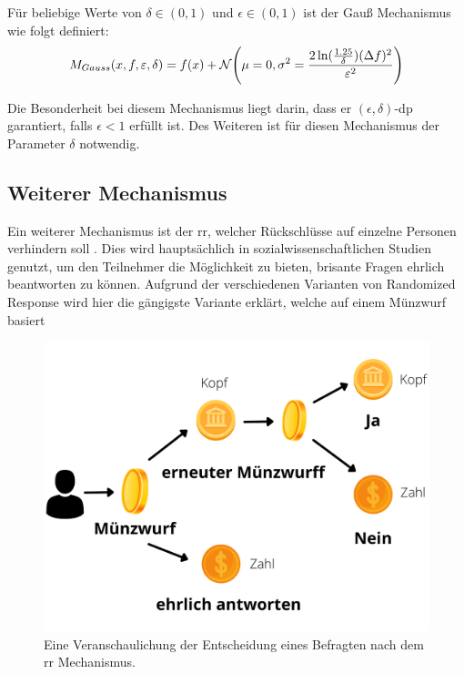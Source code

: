 Für beliebige Werte von $\delta \in (0,1)$ und $\epsilon \in (0,1)$ ist der Gauß Mechanismus wie folgt definiert:
\begin{equation*}
	M_{Gauss} (x,f,\varepsilon,\delta) = f(x) + \mathcal{N}\Biggl(\mu = 0, \sigma^2 = \frac{2\ln(\frac{1.25}{\delta}) (\Delta f)^2}{\varepsilon^2} \Biggr)
\end{equation*}

Die Besonderheit bei diesem Mechanismus liegt darin, dass er $(\epsilon,\delta)$-\gls{dp} garantiert, falls $\epsilon < 1$  erfüllt ist. Des Weiteren ist für diesen Mechanismus der Parameter $\delta$ notwendig.

\subsection{Weiterer Mechanismus}
Ein weiterer Mechanismus ist der \gls{rr}, welcher Rückschlüsse auf einzelne Personen verhindern soll \parencite{Seminar2017}. Dies wird hauptsächlich in sozialwissenschaftlichen Studien genutzt, um den Teilnehmer die Möglichkeit zu bieten, brisante Fragen ehrlich beantworten zu können. Aufgrund der verschiedenen Varianten von Randomized Response wird hier die gängigste Variante erklärt, welche auf einem Münzwurf basiert

\begin{figure}[htbp]
	\centering
	\includegraphics[scale=0.3]{./images/throw_coint.pdf}
	\caption{Eine Veranschaulichung der Entscheidung eines Befragten nach dem \gls{rr} Mechanismus.}
	\label{fig:rr_image}
\end{figure}

